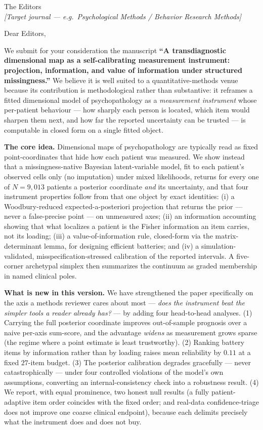 \documentclass[11pt]{letter}
\begin{document}
\begin{letter}{The Editors\\ \textit{[Target journal --- e.g.\ Psychological Methods / Behavior Research Methods]}}

\opening{Dear Editors,}

We submit for your consideration the manuscript \textbf{``A transdiagnostic dimensional map as
a self-calibrating measurement instrument: projection, information, and value of information
under structured missingness.''} We believe it is well suited to a quantitative-methods venue
because its contribution is methodological rather than substantive: it reframes a fitted
dimensional model of psychopathology as a \emph{measurement instrument} whose per-patient
behaviour --- how sharply each person is located, which item would sharpen them next, and how
far the reported uncertainty can be trusted --- is computable in closed form on a single fitted
object.

\textbf{The core idea.} Dimensional maps of psychopathology are typically read as fixed
point-coordinates that hide how each patient was measured. We show instead that a
missingness-native Bayesian latent-variable model, fit to each patient's observed cells only
(no imputation) under mixed likelihoods, returns for every one of $N=9{,}013$ patients a
posterior coordinate \emph{and} its uncertainty, and that four instrument properties follow
from that one object by exact identities: (i) a Woodbury-reduced expected-a-posteriori
projection that returns the prior --- never a false-precise point --- on unmeasured axes;
(ii) an information accounting showing that what localizes a patient is the Fisher information
an item carries, not its loading; (iii) a value-of-information rule, closed-form via the
matrix-determinant lemma, for designing efficient batteries; and (iv) a simulation-validated,
misspecification-stressed calibration of the reported intervals. A five-corner archetypal
simplex then summarizes the continuum as graded membership in named clinical poles.

\textbf{What is new in this version.} We have strengthened the paper specifically on the axis a
methods reviewer cares about most --- \emph{does the instrument beat the simpler tools a reader
already has?} --- by adding four head-to-head analyses. (1) Carrying the full posterior
coordinate improves out-of-sample prognosis over a naive per-axis sum-score, and the advantage
\emph{widens} as measurement grows sparse (the regime where a point estimate is least
trustworthy). (2) Ranking battery items by information rather than by loading raises mean
reliability by $0.11$ at a fixed $27$-item budget. (3) The posterior calibration degrades
gracefully --- never catastrophically --- under four controlled violations of the model's own
assumptions, converting an internal-consistency check into a robustness result. (4) We report,
with equal prominence, two honest null results (a fully patient-adaptive item order coincides
with the fixed order; and real-data confidence-triage does not improve one coarse clinical
endpoint), because each delimits precisely what the instrument does and does not buy.


\end{letter}
\end{document}
